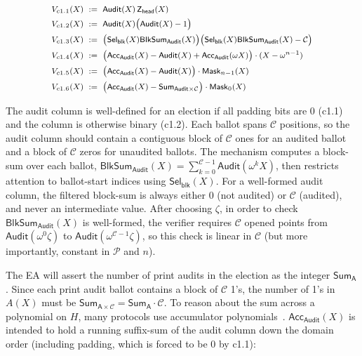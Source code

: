 \begin{mdframed}[linewidth=0.6pt,backgroundcolor=verylightpink,innerleftmargin=6pt,innerrightmargin=6pt,innertopmargin=4pt,innerbottommargin=4pt]
\[
\footnotesize
\begin{aligned}
V_{c1.1}(X)\ &:=\ \mathsf{Audit}(X)\,\mathsf{Z}_{\mathsf{head}}(X)\\
V_{c1.2}(X)\ &:=\ \mathsf{Audit}(X)\bigl(\mathsf{Audit}(X)-1\bigr) \\
V_{c1.3}(X)\ &:=\ \bigl(\mathsf{Sel}_{\mathsf{blk}}(X)\mathsf{BlkSum}_{\mathsf{Audit}}(X)\bigr)\bigl(\mathsf{Sel}_{\mathsf{blk}}(X)\mathsf{BlkSum}_{\mathsf{Audit}}(X)-\mathcal{C}\bigr) \\
V_{c1.4}(X)\ &:=\ \bigl(\mathsf{Acc}_{\mathsf{Audit}}(X)-\mathsf{Audit}(X)+\mathsf{Acc}_{\mathsf{Audit}}(\omega X)\bigr)\cdot(X-\omega^{n-1})\\
V_{c1.5}(X)\ &:=\ \bigl(\mathsf{Acc}_{\mathsf{Audit}}(X)-\mathsf{Audit}(X)\bigr)\cdot \mathsf{Mask}_{n-1}(X)\\
V_{c1.6}(X)\ &:=\ \bigl(\mathsf{Acc}_{\mathsf{Audit}}(X)-\mathsf{Sum}_{\mathsf{Audit}\times\mathcal{C}}\bigr)\cdot \mathsf{Mask}_{0}(X)
\end{aligned}
\]
\end{mdframed}

 The audit column is well-defined for an election if all padding bits are 0 (c1.1) and the column is otherwise binary (c1.2). Each ballot spans $\mathcal{C}$ positions, so the audit column should contain a contiguous block of $\mathcal{C}$ ones for an audited ballot and a block of $\mathcal{C}$ zeros for unaudited ballots. The mechanism computes a block-sum over each ballot, $\mathsf{BlkSum}_{\mathsf{Audit}}(X)=\sum_{k=0}^{\mathcal{C}-1}\mathsf{Audit}(\omega^k X)$, then restricts attention to ballot-start indices using $\mathsf{Sel}_{\mathsf{blk}}(X)$. For a well-formed audit column, the filtered block-sum is always either $0$ (not audited) or $\mathcal{C}$ (audited), and never an intermediate value. After choosing $\zeta$, in order to check $\mathsf{BlkSum}_{\mathsf{Audit}}(X)$ is well-formed, the verifier requires $\mathcal{C}$ opened points from $\mathsf{Audit}(\omega^0\zeta)$ to $\mathsf{Audit}(\omega^{\mathcal{C}-1}\zeta)$, so this check is linear in $\mathcal{C}$ (but more importantly, constant in $\mathcal{P}$ and $n$).

The EA will assert the number of print audits in the election as the integer $\mathsf{Sum}_\mathsf{A}$. Since each print audit ballot contains a block of $\mathcal{C}$ 1's, the number of 1's in $A(X)$ must be $\mathsf{Sum}_{\mathsf{A}\times\mathcal{C}}=\mathsf{Sum}_\mathsf{A}\cdot\mathcal{C}$. To reason about the sum across a polynomial on $H$, many protocols use accumulator polynomials~\cite{GWC19,BFGW19}. $\mathsf{Acc}_{\mathsf{Audit}}(X)$ is intended to hold a running suffix-sum of the audit column down the domain order (including padding, which is forced to be $0$ by c1.1):

